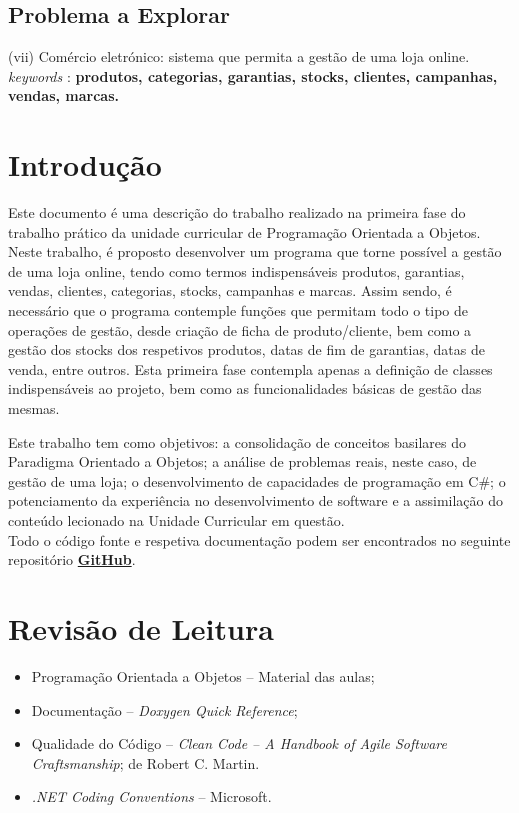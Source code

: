 \documentclass[11pt]{scrartcl} %
\begin{document}
\subsection{Problema a Explorar}
(vii) Comércio eletrónico: sistema que permita a gestão de uma loja online. \textit{keywords} : \textbf{produtos, categorias, garantias, stocks, clientes, campanhas, vendas, marcas.}

\newpage

\section{Introdução}

Este documento é uma descrição do trabalho realizado na primeira fase do trabalho prático da unidade curricular de Programação Orientada a Objetos. 
Neste trabalho, é proposto desenvolver um programa que torne possível a gestão de uma loja online, tendo como termos indispensáveis produtos, garantias, vendas, clientes, categorias, stocks, campanhas e marcas. Assim sendo, é necessário que o programa contemple funções que permitam todo o tipo de operações de gestão, desde criação de ficha de produto/cliente, bem como a gestão dos stocks dos respetivos produtos, datas de fim de garantias, datas de venda, entre outros. Esta primeira fase contempla apenas a definição de classes indispensáveis ao projeto, bem como as funcionalidades básicas de gestão das mesmas.

Este trabalho tem como objetivos: a consolidação de conceitos basilares do Paradigma Orientado a Objetos; a análise de problemas reais, neste caso, de gestão de uma loja; o desenvolvimento de capacidades de programação em C\#; o potenciamento da experiência no desenvolvimento de software e a assimilação do conteúdo lecionado na Unidade Curricular em questão.\\

Todo o código fonte e respetiva documentação podem ser encontrados no seguinte repositório \href{https://github.com/zealves99/TP_POO_27967.git}{\textbf{GitHub}}. 


\section{Revisão de Leitura}
\begin{itemize}
	\item Programação Orientada a Objetos – Material das aulas;  
	\item Documentação – \textit{Doxygen Quick Reference}; 
	\item Qualidade do Código – \textit{Clean Code – A Handbook of Agile Software Craftsmanship}; de Robert C. Martin.
	\item \textit{.NET Coding Conventions} – Microsoft.
\end{itemize}
\end{document}
